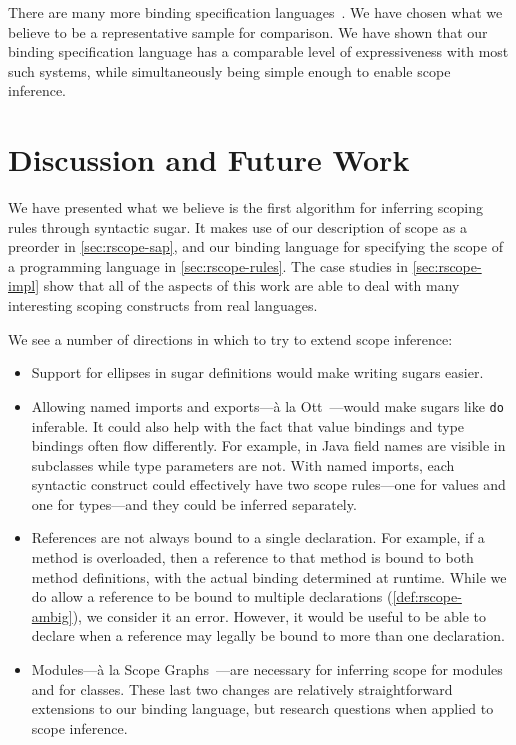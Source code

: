 There are many more binding specification
languages~\cite{aczel-church-rosser,pottier-caml,nabl}.
We have chosen what we believe to be a representative sample for
comparison. We have shown that our binding specification language
has a comparable level of expressiveness with most such systems,
while simultaneously being
simple enough to enable scope inference.

\section{Discussion and Future Work}
We have presented what we believe is the first algorithm for
inferring scoping rules through syntactic sugar. It makes use
of our description of scope as a preorder in
\cref{sec:rscope-sap}, and our binding language for specifying the
scope of a programming language in \cref{sec:rscope-rules}. The case studies
in \cref{sec:rscope-impl} show that all of the aspects of this work
are able to deal with many interesting scoping constructs from real
languages.

We see a number of directions in which to try to extend scope inference:
\begin{itemize}[noitemsep]
  \item Support for ellipses in sugar definitions would make writing
    sugars easier.
  \item Allowing named imports and exports---\`a la
    Ott~\cite{sewell-ott-jfp}---would make sugars like \texttt{do}
    inferable. It could also help with the fact that value bindings
    and type bindings often flow differently.  For example, in Java
    field names are visible in subclasses while type parameters are
    not. With named imports, each syntactic construct could
    effectively have two scope rules---one for values and one for
    types---and they could be inferred separately.
  \item References are not always bound to a single declaration.  For
    example, if a method is overloaded, then a reference to that
    method is bound to both method definitions, with the actual
    binding determined at runtime.  While we do allow a reference to
    be bound to multiple declarations (\cref{def:rscope-ambig}), we
    consider it an error. However, it would be useful to be able to
    declare when a reference may legally be bound to more than one
    declaration.
  \item Modules---\`a la Scope Graphs~\cite{neron-scope}---are
    necessary for inferring scope for modules and for classes. These
    last two changes are relatively straightforward extensions to our
    binding language, but research questions when applied to scope
    inference.
\end{itemize}


